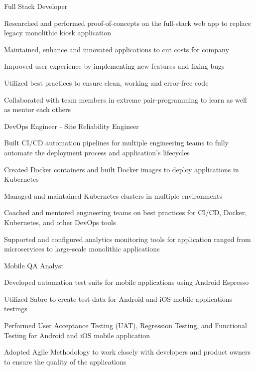 \begin{cventries}
  \cventry
      {Full Stack Developer} %
      {} %
      {} %
      {} %
      {
        \begin{cvitems} %
          \item {Researched and performed proof-of-concepts on the full-stack web app to replace legacy monolithic kiosk application}
          \item {Maintained, enhance and innovated applications to cut costs for company}
          \item {Improved user experience by implementing new features and fixing bugs}
          \item {Utilized best practices to ensure clean, working and error-free code}
          \item {Collaborated with team members in extreme pair-programming to learn as well as mentor each others}
        \end{cvitems}
      }

  \cventry
    {DevOps Engineer - Site Reliability Engineer} %
    {} %
    {} %
    {} %
    {
      \begin{cvitems} %
        \item {Built CI/CD automation pipelines for multiple engineering teams to fully automate the deployment process and application's lifecycles}
        \item {Created Docker containers and built Docker images to deploy applications in Kubernetes}
        \item {Managed and maintained Kubernetes clusters in multiple environments}
        \item {Coached and mentored engineering teams on best practices for CI/CD, Docker, Kubernetes, and other DevOps tools}
        \item {Supported and configured analytics monitoring tools for application ranged from microservices to large-scale monolithic applications}
      \end{cvitems}
    }

  \cventry
    {Mobile QA Analyst} %
    {} %
    {} %
    {} %
    {
      \begin{cvitems} %
        \item {Developed automation test suits for mobile applications using Android Espresso}
        \item {Utilized Sabre to create test data for Android and iOS mobile applications testings}
        \item {Performed User Acceptance Testing (UAT), Regression Testing, and Functional Testing for Android and iOS mobile application}
        \item {Adopted Agile Methodology to work closely with developers and product owners to ensure the quality of the applications}
      \end{cvitems}
    }


\end{cventries}
